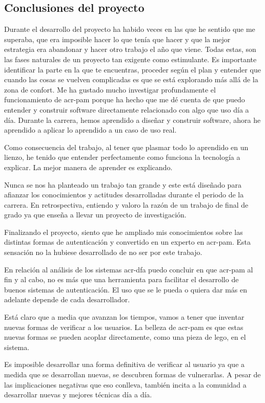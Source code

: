 \documentclass[twoside, titlepage, 12pt, a4paper]{article}
\begin{document}
{\subsection{Conclusiones del proyecto}
Durante el desarrollo del proyecto ha habido veces en las que he sentido que me superaba, que era imposible hacer lo que tenía que hacer y que la mejor estrategia era abandonar y hacer otro trabajo el año que viene. Todas estas, son las fases naturales de un proyecto tan exigente como estimulante. Es importante identificar la parte en la que te encuentras, proceder según el plan y entender que cuando las cosas se vuelven complicadas es que se está explorando más allá de la zona de confort.
Me ha gustado mucho investigar profundamente el funcionamiento de \gls{acr-pam} porque ha hecho que me dé cuenta de que puedo entender y construir software directamente relacionado con algo que uso día a día. Durante la carrera, hemos aprendido a diseñar y construir software, ahora he aprendido a aplicar lo aprendido a un caso de uso real.\par
Como consecuencia del trabajo, al tener que plasmar todo lo aprendido en un lienzo, he tenido que entender perfectamente como funciona la tecnología a explicar. La mejor manera de aprender es explicando.\par
Nunca se nos ha planteado un trabajo tan grande y este está diseñado para afianzar los conocimientos y actitudes desarrolladas durante el periodo de la carrera. En retrospectiva, entiendo y valoro la razón de un trabajo de final de grado ya que enseña a llevar un proyecto de investigación. \par
Finalizando el proyecto, siento que he ampliado mis conocimientos sobre las distintas formas de autenticación y convertido en un experto en \gls{acr-pam}. Esta sensación no la hubiese desarrollado de no ser por este trabajo.\par
En relación al análisis de los sistemas \gls{acr-dfa} puedo concluir en que \gls{acr-pam} al fin y al cabo, no es más que una herramienta para facilitar el desarrollo de buenos sistemas de autenticación. El uso que se le pueda o quiera dar más en adelante depende de cada desarrollador. \par
Está claro que a media que avanzan los tiempos, vamos a tener que inventar nuevas formas de verificar a los usuarios. La belleza de \gls{acr-pam} es que estas nuevas formas se pueden acoplar directamente, como una pieza de lego, en el sistema.\par
Es imposible desarrollar una forma definitiva de verificar al usuario ya que a medida que se desarrollan nuevas, se descubren formas de vulnerarlas. A pesar de las implicaciones negativas que eso conlleva, también incita a la comunidad a desarrollar nuevas y mejores técnicas día a día.
}
\end{document}

